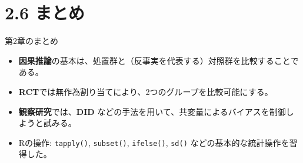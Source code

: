 \documentclass[
  ignorenonframetext,
]{beamer}
\providecommand{\tightlist}{%
  \setlength{\itemsep}{0pt}\setlength{\parskip}{0pt}}
\begin{document}
\hypertarget{ux307eux3068ux3081}{%
\section{2.6 まとめ}\label{ux307eux3068ux3081}}

\begin{frame}[fragile]{第2章のまとめ}
\protect\hypertarget{ux7b2c2ux7ae0ux306eux307eux3068ux3081}{}
\begin{itemize}
\tightlist
\item
  \textbf{因果推論}の基本は、処置群と（反事実を代表する）対照群を比較することである。
\item
  \textbf{RCT}では無作為割り当てにより、2つのグループを比較可能にする。
\item
  \textbf{観察研究}では、\textbf{DID}
  などの手法を用いて、共変量によるバイアスを制御しようと試みる。
\item
  Rの操作: \texttt{tapply()}, \texttt{subset()}, \texttt{ifelse()},
  \texttt{sd()} などの基本的な統計操作を習得した。
\end{itemize}
\end{frame}
\end{document}

